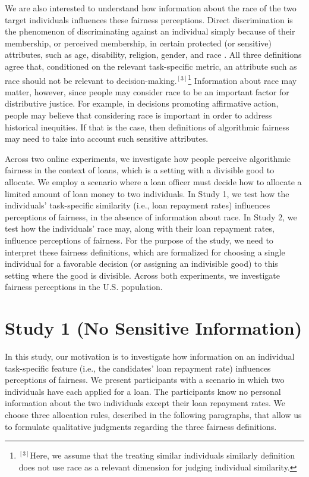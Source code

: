 \documentclass[letterpaper]{article} %
\begin{document}
We are also interested to understand how information about the race of the two target individuals influences these fairness perceptions. Direct discrimination is the phenomenon of discriminating against an individual simply because of their membership, or perceived membership, in certain protected (or sensitive) attributes, such as age, disability, religion, gender, and race \cite{ellis2012eu}. All three definitions agree that, conditioned on the relevant task-specific metric, an attribute such as race should not be relevant to decision-making.$^{[3]}$\footnote{$^{[3]}$Here, we assume that the treating similar individuals similarly definition~\cite{dwork2012fairness} 
does not use race as a relevant dimension for judging individual similarity.}
%
%
Information about race may matter, however, since people may consider race to be an important factor for distributive justice. For example, in decisions promoting affirmative action, people may believe that considering race is important in order to address historical inequities. If that is the case, then definitions of algorithmic fairness may need to take into account such sensitive attributes.

Across two online experiments, we investigate how people perceive algorithmic fairness in the context of loans, which is a setting with a divisible good to allocate. We employ a scenario where a loan officer must decide how to allocate a limited amount of loan money to two individuals. In Study 1, we test how the individuals' task-specific similarity (i.e., loan repayment rates) influences perceptions of fairness, in the absence of information about race. In Study 2, we test how the individuals' race may, along with their loan repayment rates, influence perceptions of fairness. For the purpose of the study, we need to interpret these fairness definitions, which are formalized for choosing a single individual for a favorable decision (or assigning an indivisible good) to this setting where the good is divisible. Across both experiments, we investigate fairness perceptions in the U.S. population.

\section{Study 1 (No Sensitive Information)}

In this study, our motivation is to investigate how information on an individual task-specific feature (i.e., the candidates' loan repayment rate) influences perceptions of fairness. We present participants with a scenario in which two individuals have each applied for a loan. The participants know no personal information about the two individuals except their loan repayment rates. We choose three allocation rules, described in the following paragraphs, that allow us to formulate qualitative judgments regarding the three fairness definitions.
\end{document}
